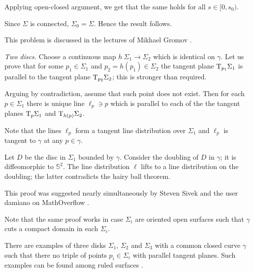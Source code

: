 Applying open-closed argument, we get that the same holds for all $s\in[0,s_0)$.

Since $\Sigma$ is connected, $\Sigma_0=\Sigma$.
Hence the result follows.

This problem is discussed in the lectures of Mikhael Gromov \cite[see \S\textonehalf in][]{gromov-SGMC}.



\textit{Two discs.}
Choose a continuous map $h\:\Sigma_1\to \Sigma_2$
which is identical on $\gamma$.
Let us prove that for some $p_1\in \Sigma_1$ and $p_2=h(p_1)\in \Sigma_2$
the tangent plane $\mathrm{T}_{p_1} \Sigma_1$ is parallel to the tangent plane $\mathrm{T}_{p_2} \Sigma_2$;
this is stronger than required.

Arguing by contradiction,
assume that such point does not exist.
Then for each $p\in\Sigma_1$
there is unique line $\ell_p\ni p$ 
which is parallel to each of the the tangent planes $\mathrm{T}_{p} \Sigma_1$ and $\mathrm{T}_{h(p)} \Sigma_2$.

Note that the lines $\ell_p$ form a tangent line distribution over $\Sigma_1$
and $\ell_p$ is tangent to $\gamma$ at any $p\in\gamma$.

Let $D$ be the disc in $\Sigma_1$ bounded by $\gamma$.
Consider the doubling of $D$ in $\gamma$;
it is diffeomorphic to $\mathbb S^2$.
The line distribution $\ell$ lifts to a line distribution on the doubling;
the latter contradicts the hairy ball theorem.

This proof was suggested nearly simultaneously 
by Steven Sivek 
and the user damiano on MathOverflow \cite[see][]{two-discs}.

Note that the same proof works in case $\Sigma_i$ are oriented open surfaces such that $\gamma$ cuts a compact domain in each $\Sigma_i$.

There are examples of three disks $\Sigma_1$, $\Sigma_2$ and $\Sigma_3$
with a common closed curve $\gamma$ such that there 
no triple of points $p_i\in\Sigma_i$ with parallel tangent planes.
Such examples can be found among ruled surfaces \cite[see][]{three-discs}.










